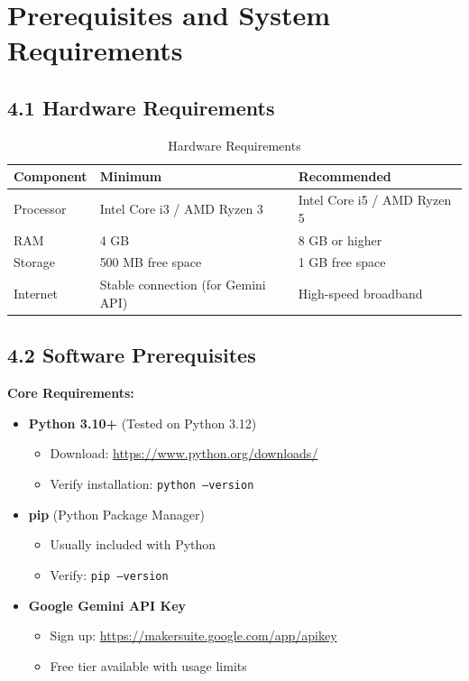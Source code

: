 \documentclass[a4paper,11pt]{article}
\begin{document}
\clearpage

\section{Prerequisites and System Requirements}

\subsection{4.1 Hardware Requirements}

\begin{table}[H]
\centering
\begin{tabularx}{\textwidth}{|l|X|X|}
\hline
\rowcolor{blue!10}
\textbf{Component} & \textbf{Minimum} & \textbf{Recommended} \\
\hline
Processor & Intel Core i3 / AMD Ryzen 3 & Intel Core i5 / AMD Ryzen 5 \\
\hline
RAM & 4 GB & 8 GB or higher \\
\hline
Storage & 500 MB free space & 1 GB free space \\
\hline
Internet & Stable connection (for Gemini API) & High-speed broadband \\
\hline
\end{tabularx}
\caption{Hardware Requirements}
\end{table}

\subsection{4.2 Software Prerequisites}

\textbf{Core Requirements:}
\begin{itemize}[leftmargin=*]
    \item \textbf{Python 3.10+} (Tested on Python 3.12)
    \begin{itemize}
        \item Download: \url{https://www.python.org/downloads/}
        \item Verify installation: \texttt{python --version}
    \end{itemize}
    
    \item \textbf{pip} (Python Package Manager)
    \begin{itemize}
        \item Usually included with Python
        \item Verify: \texttt{pip --version}
    \end{itemize}
    
    \item \textbf{Google Gemini API Key}
    \begin{itemize}
        \item Sign up: \url{https://makersuite.google.com/app/apikey}
        \item Free tier available with usage limits
    \end{itemize}
\end{itemize}
\end{document}
